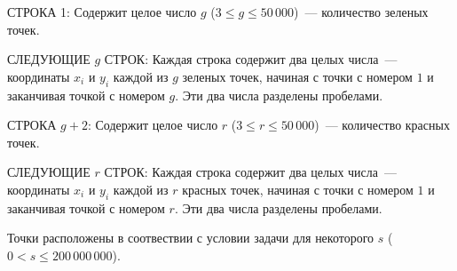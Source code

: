 СТРОКА 1: Содержит целое число $g$ ($3 \le g \le 50\,000$)~--- количество зеленых точек.

СЛЕДУЮЩИЕ $g$ СТРОК: Каждая строка содержит два целых числа~--- координаты $x_i$ и $y_i$  каждой из $g$ зеленых точек, начиная с точки с номером $1$ и заканчивая точкой с номером $g$. Эти два числа разделены пробелами.

СТРОКА $g + 2$: Содержит целое число $r$ ($3 \le r \le 50\,000$)~--- количество красных точек.

СЛЕДУЮЩИЕ $r$ СТРОК: Каждая строка содержит два целых числа~--- координаты $x_i$ и $y_i$  каждой из $r$ красных точек, начиная с точки с номером $1$ и заканчивая точкой с номером $r$. Эти два числа разделены пробелами.

Точки расположены в соотвествии с условии задачи для некоторого $s$ ($0 < s \le 200\,000\,000$).